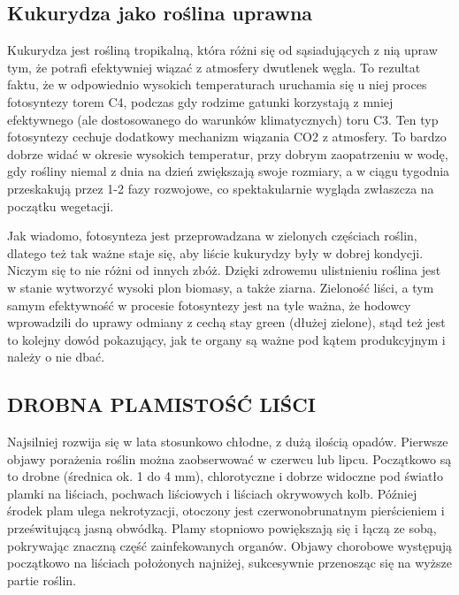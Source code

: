 \documentclass{article}
\begin{document}
\subsection{Kukurydza jako roślina uprawna}
Kukurydza jest rośliną tropikalną, która różni się od sąsiadujących z nią upraw tym,
że potrafi efektywniej wiązać z atmosfery dwutlenek węgla. 
To rezultat faktu, że w odpowiednio wysokich temperaturach uruchamia się u niej proces fotosyntezy
torem C4, podczas gdy rodzime gatunki korzystają z mniej efektywnego 
(ale dostosowanego do warunków klimatycznych) toru C3.
Ten typ fotosyntezy cechuje dodatkowy mechanizm wiązania CO2 z atmosfery. 
To bardzo dobrze widać w okresie wysokich temperatur, przy dobrym zaopatrzeniu w wodę, 
gdy rośliny niemal z dnia na dzień zwiększają swoje rozmiary, a w ciągu tygodnia przeskakują
przez 1-2 fazy rozwojowe, co spektakularnie wygląda zwłaszcza na początku wegetacji.

Jak wiadomo, fotosynteza jest przeprowadzana w zielonych częściach roślin, dlatego też tak ważne
staje się, aby liście kukurydzy były w dobrej kondycji.
Niczym się to nie różni od innych zbóż. Dzięki zdrowemu ulistnieniu roślina jest w stanie 
wytworzyć wysoki plon biomasy, a także ziarna.
Zieloność liści, a tym samym efektywność w procesie fotosyntezy jest na tyle ważna,
że hodowcy wprowadzili do uprawy odmiany z cechą stay green (dłużej zielone), 
stąd też jest to kolejny dowód pokazujący, jak te organy są ważne pod kątem produkcyjnym i należy 
o nie dbać.

\subsection{DROBNA PLAMISTOŚĆ LIŚCI}
Najsilniej rozwija się w lata stosunkowo chłodne, z dużą ilością opadów. 
Pierwsze objawy porażenia roślin można zaobserwować w czerwcu lub lipcu. 
Początkowo są to drobne (średnica ok. 1 do 4 mm), chlorotyczne i dobrze widoczne pod światło 
plamki na liściach, pochwach liściowych i liściach okrywowych kolb.
Później środek plam ulega nekrotyzacji, otoczony jest czerwonobrunatnym pierścieniem i
prześwitującą jasną obwódką. 
Plamy stopniowo powiększają się i łączą ze sobą, pokrywając znaczną część zainfekowanych organów.
Objawy chorobowe występują początkowo na liściach położonych najniżej, sukcesywnie przenosząc się 
na wyższe partie roślin.

\end{document}
